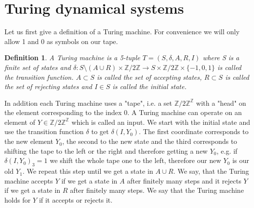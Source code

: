\documentclass[12pt,a4paper]{scrartcl}
\newtheorem{Definition}[Theorem]{Definition}
\numberwithin{equation}{section}
\newcommand{\Z}{\mathbb{Z}} %
\newcommand{\2}{\mathbb{Z} / 2 \mathbb{Z}}
\newcommand{\1}{\overline{1}}
\newcommand{\0}{\overline{0}}
\begin{document}
\section{Turing dynamical systems}
Let us first give a definition of a Turing machine. For convenience we will only allow 1 and 0 as symbols on our tape.
\begin{Definition}
	A Turing machine is a 5-tuple $T=(S,\delta, A, R, I)$ where S is a finite set of states and $\delta: S \setminus(A \cup R) \times \2 \to S \times \2 \times \{-1, 0, 1\}$ is called the transition function. $A \subset S$ is called the set of accepting states, $R \subset S$ is called the set of rejecting states and $I \in S$ is called the initial state.
\end{Definition}
In addition each Turing machine uses a "tape", i.e. a set $\Z / 2\Z ^{\Z}$ with a "head" on the element corresponding to the index 0. A Turing machine can operate on an element of $Y \in \Z / 2\Z ^{\Z}$ which is called an input. We start with the initial state and use the transition function $\delta$ to get $\delta(I, Y_0)$. The first coordinate corresponds to the new element $Y_0$, the second to the new state and the third corresponds to shifting the tape to the left or the right and therefore getting a new $Y_0$, e.g. if $\delta(I, Y_0)_3 = 1$ we shift the whole tape one to the left, therefore our new $Y_0$ is our old $Y_1$. We repeat this step until we get a state in $A \cup R$. We say, that the Turing machine accepts $Y$ if we get a state in $A$ after finitely many steps and it rejects $Y$ if we get a state in $R$ after finitely many steps. We say that the Turing machine holds for $Y$ if it accepts or rejects it.

\end{document}
